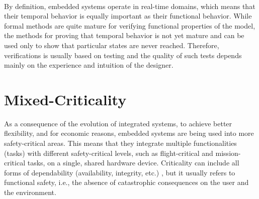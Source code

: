 \paragraph{}By definition, embedded systems operate in real-time domains, which means that their temporal behavior is equally important as their functional behavior. While formal methods are quite mature for verifying functional properties of the model, the methods for proving that temporal behavior is not yet mature and can be used only to show that particular states are never reached. Therefore, verifications is usually based on testing and the quality of such tests depends mainly on the experience and intuition of the designer. 


\section{Mixed-Criticality}
As a consequence of the evolution of integrated systems, to achieve better flexibility, and for economic reasons, embedded systems are being used into more safety-critical areas. 
This means that they integrate multiple functionalities (tasks) with different safety-critical levels, such as flight-critical and mission-critical tasks, on a single, shared hardware device. Criticality can include all forms of dependability (availability, integrity, etc.) \cite{dependability}, but it usually refers to functional safety, i.e., the absence of catastrophic consequences on the user and the environment. %

